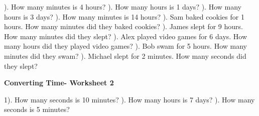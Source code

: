 \documentclass{article}%
\begin{document}
\newline%
\newline%
). How many minutes is 4 hours?%
\newline%
\newline%
). How many hours is 1 days?%
\newline%
\newline%
). How many hours is 3 days?%
\newline%
\newline%
). How many minutes is 14 hours?%
\newline%
\newline%
). Sam baked cookies for 1 hours. How many minutes did they baked cookies?%
\newline%
\newline%
). James slept for 9 hours. How many minutes did they slept?%
\newline%
\newline%
). Alex played video games for 6 days. How many hours did they played video games?%
\newline%
\newline%
). Bob swam for 5 hours. How many minutes did they swam?%
\newline%
\newline%
). Michael slept for 2 minutes. How many seconds did they slept?%
\newline%
\newline%
\newline%
\pagebreak%
\large%
\begin{center}%
\textbf{Converting Time- Worksheet 2}%
\newline%
\end{center} \normalsize%
1). How many seconds is 10 minutes?%
\newline%
\newline%
). How many hours is 7 days?%
\newline%
\newline%
). How many seconds is 5 minutes?%
\end{document}
